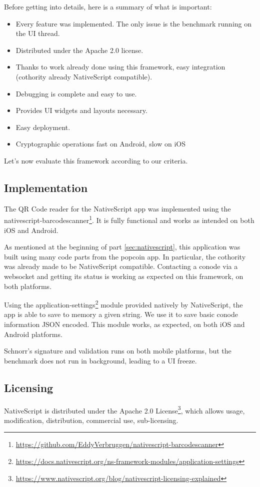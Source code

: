 \documentclass[11pt, a4paper, twoside, openright]{article} %
\begin{document}
{Before getting into details, here is a summary of what is important:
\begin{itemize}
	\item Every feature was implemented. The only issue is the benchmark running on the UI thread.
	\item Distributed under the Apache 2.0 license.
	\item Thanks to work already done using this framework, easy integration (cothority already NativeScript compatible).
	\item Debugging is complete and easy to use.
	\item Provides UI widgets and layouts necessary.
	\item Easy deployment.
	\item Cryptographic operations fast on Android, slow on iOS
\end{itemize}

Let's now evaluate this framework according to our criteria.

\subsection{Implementation}
The QR Code reader for the NativeScript app was implemented using the nativescript-barcodescanner\footnote{\url{https://github.com/EddyVerbruggen/nativescript-barcodescanner}}. It is fully functional and works as intended on both iOS and Android.

As mentioned at the beginning of part \ref{sec:nativescript}, this application was built using many code parts from the popcoin app. In particular, the cothority was already made to be NativeScript compatible. Contacting a conode via a websocket and getting its status is working as expected on this framework, on both platforms.

Using the application-settings\footnote{\url{https://docs.nativescript.org/ns-framework-modules/application-settings}} module provided natively by NativeScript, the app is able to save to memory a given string. We use it to save basic conode information JSON encoded. This module works, as expected, on both iOS and Android platforms.

Schnorr's signature and validation runs on both mobile platforms, but the benchmark does not run in background, leading to a UI freeze.

\subsection{Licensing}
NativeScript is distributed under the Apache 2.0 License\footnote{\url{https://www.nativescript.org/blog/nativescript-licensing-explained}}, which allows usage, modification, distribution, commercial use, sub-licensing. 

}
\end{document}
